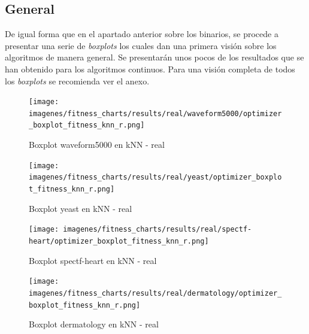 \subsection{General}
De igual forma que en el apartado anterior sobre los binarios, se procede a presentar una serie de \textit{boxplots} los cuales dan una primera visión sobre los algoritmos de manera general. Se presentarán unos pocos de los resultados que se han obtenido para los algoritmos continuos. Para una visión completa de todos los \textit{boxplots} se recomienda ver el anexo.

\begin{figure}[htp]
    \centering
    \texttt{[image: imagenes/fitness\_charts/results/real/waveform5000/optimizer\_boxplot\_fitness\_knn\_r.png]}
    \caption{Boxplot waveform5000 en kNN - real}
    \label{fig:boxplot_waveform5000}
\end{figure}

\begin{figure}[htp]
    \centering
    \texttt{[image: imagenes/fitness\_charts/results/real/yeast/optimizer\_boxplot\_fitness\_knn\_r.png]}
    \caption{Boxplot yeast en kNN - real}
    \label{fig:boxplot_yeast}
\end{figure}

\begin{figure}[htp]
    \centering
    \texttt{[image: imagenes/fitness\_charts/results/real/spectf-heart/optimizer\_boxplot\_fitness\_knn\_r.png]}
    \caption{Boxplot spectf-heart en kNN - real}
    \label{fig:boxplot_spectf-heart}
\end{figure}

\begin{figure}[htp]
    \centering
    \texttt{[image: imagenes/fitness\_charts/results/real/dermatology/optimizer\_boxplot\_fitness\_knn\_r.png]}
    \caption{Boxplot dermatology en kNN - real}
    \label{fig:boxplot_dermatology}
\end{figure}

